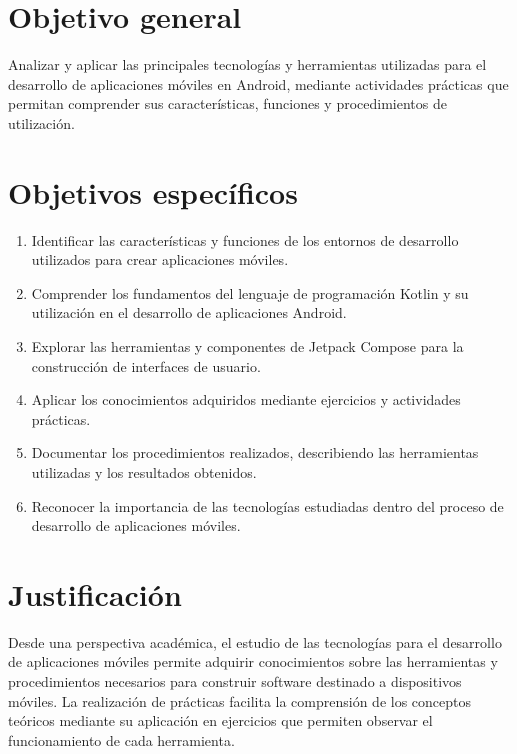 \documentclass[12pt,a4paper]{article}
\begin{document}
\section{Objetivo general}

Analizar y aplicar las principales tecnologías y herramientas
utilizadas para el desarrollo de aplicaciones móviles en
Android, mediante actividades prácticas que permitan
comprender sus características, funciones y procedimientos
de utilización.	

\section{Objetivos específicos}

\begin{enumerate}
	\item Identificar las características y funciones de los
	entornos de desarrollo utilizados para crear aplicaciones
	móviles.
	
	\item Comprender los fundamentos del lenguaje de
	programación Kotlin y su utilización en el desarrollo
	de aplicaciones Android.
	
	\item Explorar las herramientas y componentes de
	Jetpack Compose para la construcción de interfaces
	de usuario.
	
	\item Aplicar los conocimientos adquiridos mediante
	ejercicios y actividades prácticas.
	
	\item Documentar los procedimientos realizados,
	describiendo las herramientas utilizadas y los
	resultados obtenidos.
	
	\item Reconocer la importancia de las tecnologías
	estudiadas dentro del proceso de desarrollo de
	aplicaciones móviles.
\end{enumerate}


\section{Justificación}

Desde una perspectiva académica, el estudio de las tecnologías
para el desarrollo de aplicaciones móviles permite adquirir
conocimientos sobre las herramientas y procedimientos
necesarios para construir software destinado a dispositivos
móviles. La realización de prácticas facilita la comprensión
de los conceptos teóricos mediante su aplicación en ejercicios
que permiten observar el funcionamiento de cada herramienta.
\end{document}
